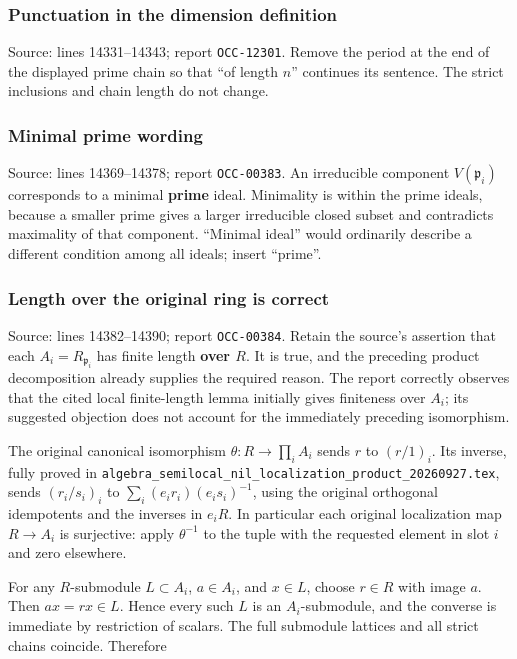 \subsubsection{Punctuation in the dimension definition}\label{punctuation-in-the-dimension-definition}

Source: lines 14331--14343; report \texttt{OCC-12301}. Remove the period at the end of the displayed prime chain so that ``of length \(n\)'' continues its sentence. The strict inclusions and chain length do not change.

\subsubsection{Minimal prime wording}\label{minimal-prime-wording}

Source: lines 14369--14378; report \texttt{OCC-00383}. An irreducible component \(V(\mathfrak p_i)\) corresponds to a minimal \textbf{prime} ideal. Minimality is within the prime ideals, because a smaller prime gives a larger irreducible closed subset and contradicts maximality of that component. ``Minimal ideal'' would ordinarily describe a different condition among all ideals; insert ``prime''.

\subsubsection{Length over the original ring is correct}\label{length-over-the-original-ring-is-correct}

Source: lines 14382--14390; report \texttt{OCC-00384}. Retain the source's assertion that each \(A_i=R_{\mathfrak p_i}\) has finite length \textbf{over \(R\)}. It is true, and the preceding product decomposition already supplies the required reason. The report correctly observes that the cited local finite-length lemma initially gives finiteness over \(A_i\); its suggested objection does not account for the immediately preceding isomorphism.

The original canonical isomorphism \(\theta:R\to\prod_i A_i\) sends \(r\) to \((r/1)_i\). Its inverse, fully proved in \texttt{algebra\_semilocal\_nil\_localization\_product\_20260927.tex}, sends \((r_i/s_i)_i\) to \(\sum_i(e_i r_i)(e_i s_i)^{-1}\), using the original orthogonal idempotents and the inverses in \(e_iR\). In particular each original localization map \(R\to A_i\) is surjective: apply \(\theta^{-1}\) to the tuple with the requested element in slot \(i\) and zero elsewhere.

For any \(R\)-submodule \(L\subset A_i\), \(a\in A_i\), and \(x\in L\), choose \(r\in R\) with image \(a\). Then \(ax=rx\in L\). Hence every such \(L\) is an \(A_i\)-submodule, and the converse is immediate by restriction of scalars. The full submodule lattices and all strict chains coincide. Therefore

